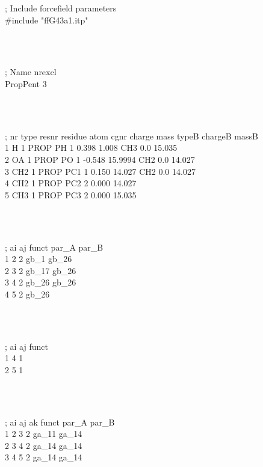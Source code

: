 \begin{tt}
; Include forcefield parameters\\
\#include "ffG43a1.itp"\\
\end{tt}\\
\begin{tt}
[ moleculetype ]\\
; Name            nrexcl\\
PropPent          3\\
\end{tt}\\
\begin{tt}
[ atoms ]\\
; nr type resnr residue atom cgnr  charge    mass  typeB chargeB  massB\\
  1    H    1     PROP    PH    1   0.398    1.008  CH3     0.0  15.035\\
  2   OA    1     PROP    PO    1  -0.548  15.9994  CH2     0.0  14.027\\
  3  CH2    1     PROP   PC1    1   0.150   14.027  CH2     0.0  14.027\\
  4  CH2    1     PROP   PC2    2   0.000   14.027\\
  5  CH3    1     PROP   PC3    2   0.000   15.035\\
\end{tt}\\
\begin{tt}
[ bonds ]\\
;  ai    aj funct    par\_A  par\_B \\
    1     2     2    gb\_1   gb\_26\\
    2     3     2    gb\_17  gb\_26\\
    3     4     2    gb\_26  gb\_26\\
    4     5     2    gb\_26\\
\end{tt}\\
\begin{tt}
[ pairs ]\\
;  ai    aj funct\\
    1     4     1\\
    2     5     1\\
\end{tt}\\
\begin{tt}
[ angles ]\\
;  ai    aj    ak funct    par\_A   par\_B\\
    1     2     3     2    ga\_11   ga\_14\\
    2     3     4     2    ga\_14   ga\_14\\
    3     4     5     2    ga\_14   ga\_14\\
\end{tt}\\
